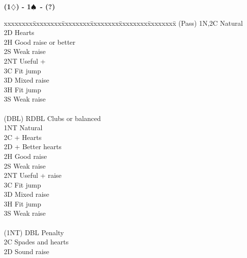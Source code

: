 \documentclass[10pt]{article}
\renewcommand{\d}{$\diamondsuit$}
\newcommand{\s}{$\spadesuit$}
\newcommand{\x}{DBL}
\newenvironment{bidtable}[1][]
{\textbf{#1}
  \begin{adjustwidth}{1em}{}
    \addvspace{2pt}
    \begin{tabbing}
      xxxxxxxx\=xxxxxxxx\=xxxxxxxx\=xxxxxxxx\=xxxxxxxx\=xxxxxxxx\=\kill}
{\end{tabbing}\end{adjustwidth}\bigskip}%
\begin{document}
\begin{multicols*}{2}
\begin{bidtable}[(1\d) - 1\s\ - (?)]
(Pass) \> 1N,2C \> Natural                                 \\
       \> 2D    \> Hearts                                  \\
       \> 2H    \> Good raise or better                    \\
       \> 2S    \> Weak raise                              \\
       \> 2NT   \> Useful +                                \\
       \> 3C    \> Fit jump                                \\
       \> 3D    \> Mixed raise                             \\
       \> 3H    \> Fit jump                                \\
       \> 3S    \> Weak raise                              \\
                                                           \\
(\x)   \> RDBL  \> Clubs or balanced                       \\
       \> 1NT   \> Natural                                 \\
       \> 2C    + Hearts                               \\
       \> 2D    + Better hearts                        \\
       \> 2H    \> Good raise                              \\
       \> 2S    \> Weak raise                              \\
       \> 2NT   \> Useful + raise                          \\
       \> 3C    \> Fit jump                                \\
       \> 3D    \> Mixed raise                             \\
       \> 3H    \> Fit jump                                \\
       \> 3S    \> Weak raise                              \\
                                                           \\
(1NT)  \> DBL   \> Penalty                                 \\
       \> 2C    \> Spades and hearts                       \\
       \> 2D    \> Sound raise                             \\

\end{bidtable}
\end{multicols*}
\end{document}
